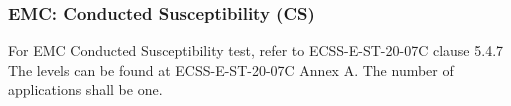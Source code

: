 \subsubsection{EMC: Conducted Susceptibility (CS)}
For EMC Conducted Susceptibility test, refer to ECSS-E-ST-20-07C clause 5.4.7 The
levels can be found at ECSS-E-ST-20-07C Annex A. The number of applications shall be one.














